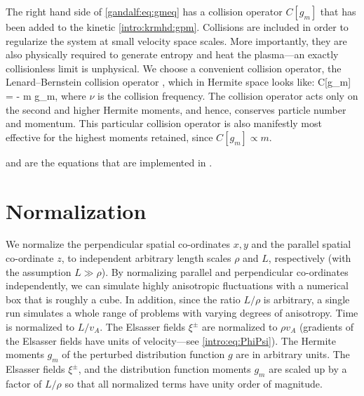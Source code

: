     The right hand side of \eqref{gandalf:eq:gmeq} has a collision operator $C[g_m]$ that
    has been added to the kinetic \eqref{intro:krmhd:gpm}. Collisions are included in order to regularize the system at small velocity space scales. More
    importantly, they are also physically required to generate entropy and heat the 
    plasma---an exactly collisionless limit is unphysical.
    We choose a convenient collision operator, the Lenard--Bernstein 
    collision operator \cite{lenard58}, which in Hermite space looks like:
    \beq
        C[g_m] = - \nu m g_m,
    \eeq
    where $\nu$ is the collision frequency. The collision operator acts only on
    the second and higher Hermite moments, and hence, conserves particle number and
    momentum. This particular collision operator is also manifestly most effective for the highest
    moments retained, since $C[g_m] \propto m$.
    
     and
     are the equations that are
    implemented in \Gand.
    
\section{Normalization}

    We normalize the perpendicular spatial co-ordinates $x, y$ and the parallel spatial
    co-ordinate $z$, to independent arbitrary length scales $\rho$ and $L$, respectively
    (with the assumption $L \gg \rho$). By normalizing parallel and perpendicular
    co-ordinates independently, we can simulate highly anisotropic fluctuations with
    a numerical box that is roughly a cube. In addition, since the ratio $L/\rho$ is
    arbitrary, a single run simulates a whole range of problems with varying degrees of
    anisotropy.  
     Time is normalized to $L/v_A$. 
    The Elsasser fields $\xi^\pm$ are normalized to $\rho v_A$ (gradients of the Elsasser
    fields have units of velocity---see \eqref{intro:eq:PhiPsi}).  The Hermite moments $g_m$ of
	the perturbed
    distribution function $g$ are in arbitrary units. The Elsasser fields $\xi^\pm$, and
	the distribution function moments $g_m$
    are scaled up by a factor of $L/\rho$ so that all normalized terms have unity order of
    magnitude.
    
